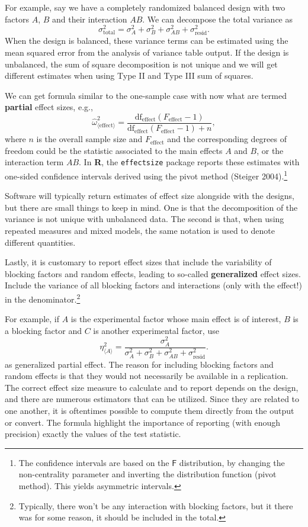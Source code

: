 \documentclass[
  11pt,
  letterpaper,
]{scrbook}
\theoremstyle{definition}
\theoremstyle{definition}
\theoremstyle{remark}
\begin{document}
For example, say we have a completely randomized balanced design with
two factors \(A\), \(B\) and their interaction \(AB\). We can decompose
the total variance as
\[\sigma^2_{\text{total}} = \sigma^2_A + \sigma^2_B + \sigma^2_{AB} + \sigma^2_{\text{resid}}.\]
When the design is balanced, these variance terms can be estimated using
the mean squared error from the analysis of variance table output. If
the design is unbalanced, the sum of square decomposition is not unique
and we will get different estimates when using Type II and Type III sum
of squares.

We can get formula similar to the one-sample case with now what are
termed \textbf{partial} effect sizes, e.g.,
\[\widehat{\omega}^2_{\langle \text{effect} \rangle} = \frac{\text{df}_{\text{effect}}(F_{\text{effect}}-1)}{\text{df}_{\text{effect}}(F_{\text{effect}}-1) + n},\]
where \(n\) is the overall sample size and \(F_\text{effect}\) and the
corresponding degrees of freedom could be the statistic associated to
the main effects \(A\) and \(B\), or the interaction term \(AB\). In
\textbf{R}, the \texttt{effectsize} package reports these estimates with
one-sided confidence intervals derived using the pivot method (Steiger
2004).\footnote{The confidence intervals are based on the \(\mathsf{F}\)
  distribution, by changing the non-centrality parameter and inverting
  the distribution function (pivot method). This yields asymmetric
  intervals.}

Software will typically return estimates of effect size alongside with
the designs, but there are small things to keep in mind. One is that the
decomposition of the variance is not unique with unbalanced data. The
second is that, when using repeated measures and mixed models, the same
notation is used to denote different quantities.

Lastly, it is customary to report effect sizes that include the
variability of blocking factors and random effects, leading to so-called
\textbf{generalized} effect sizes. Include the variance of all blocking
factors and interactions (only with the effect!) in the
denominator.\footnote{Typically, there won't be any interaction with
  blocking factors, but it there was for some reason, it should be
  included in the total.}

For example, if \(A\) is the experimental factor whose main effect is of
interest, \(B\) is a blocking factor and \(C\) is another experimental
factor, use
\[\eta_{\langle A \rangle}^2 = \frac{\sigma^2_A}{\sigma^2_A + \sigma^2_B + \sigma^2_{AB} + \sigma^2_{\text{resid}}}.\]
as generalized partial effect. The reason for including blocking factors
and random effects is that they would not necessarily be available in a
replication. The correct effect size measure to calculate and to report
depends on the design, and there are numerous estimators that can be
utilized. Since they are related to one another, it is oftentimes
possible to compute them directly from the output or convert. The
formula highlight the importance of reporting (with enough precision)
exactly the values of the test statistic.
\end{document}
